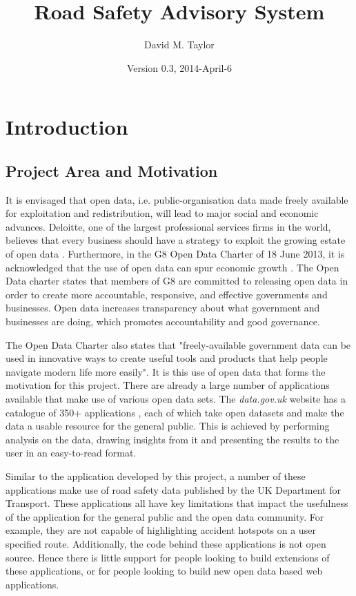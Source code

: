 \documentclass[authoryearcitations]{UoYCSproject}
\author{David M. Taylor}
\title{Road Safety Advisory System}
\date{Version 0.3, 2014-April-6}
\begin{document}
\maketitle
\listoffigures
\listoftables
\renewcommand*{\lstlistlistingname}{List of Listings}
\lstlistoflistings

\cleardoublepage
\label{sec:start}
\thispagestyle{empty}\cleardoublepage

\chapter{Introduction}

\section{Project Area and Motivation}

It is envisaged that open data, i.e. public-organisation data made freely available for exploitation and redistribution, will lead to major social and economic advances. Deloitte, one of the largest professional services firms in the world, believes that every business should have a strategy to exploit the growing estate of open data \citep{DeloitteAnalytics2012}. Furthermore, in the G8 Open Data Charter of 18 June 2013, it is acknowledged that the use of open data can spur economic growth \citep{CabinetOffice2013}. The Open Data charter states that members of G8 are committed to releasing open data in order to create more accountable, responsive, and effective governments and businesses. Open data increases transparency about what government and businesses are doing, which promotes accountability and good governance.

The Open Data Charter also states that "freely-available government data can be used in innovative ways to create useful tools and products that help people navigate modern life more easily". It is this use of open data that forms the motivation for this project. There are already a large number of applications available that make use of various open data sets. The \textit{data.gov.uk} website has a catalogue of 350+ applications \citep{Data.go}, each of which take open datasets and make the data a usable resource for the general public. This is achieved by performing analysis on the data, drawing insights from it and presenting the results to the user in an easy-to-read format. 

Similar to the application developed by this project, a number of these applications make use of road safety data published by the UK Department for Transport. These applications all have key limitations that impact the usefulness of the application for the general public and the open data community. For example, they are not capable of highlighting accident hotspots on a user specified route. Additionally, the code behind these applications is not open source. Hence there is little support for people looking to build extensions of these applications, or for people looking to build new open data based web applications.
\end{document}
